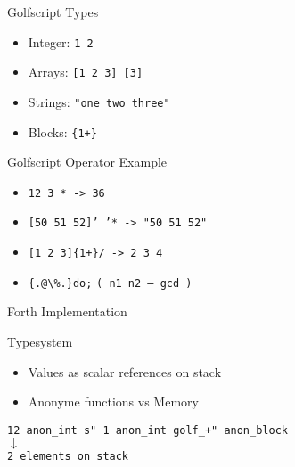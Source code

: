 \documentclass{beamer}
\newcommand{\zwischenueberschrift}[1] { 
    \Huge{#1}
}
\begin{document}
\begin{frame}
    
    \vspace{0.5cm}

    Golfscript Types
    \begin{itemize}
        \item Integer: \texttt{1 2}
        \item Arrays:  \texttt{[1 2 3] [3]}
        \item Strings: \texttt{"one two three"}
        \item Blocks:  \texttt{\{1+\}}
    \end{itemize}

    \vspace{0.5cm}
    \pause 

    Golfscript Operator Example
    \begin{itemize}
        \item \texttt{12 3 * -> 36}
        \item \texttt{[50 51 52]' '* -> "50 51 52"}
        \item \texttt{[1 2 3]\{1+\}/ -> 2 3 4 }
        \item \texttt{\{.@\textbackslash\%.\}do;}  \texttt{( n1 n2 -- gcd )}
    \end{itemize}


\end{frame}


\begin{frame}
\begin{center}
\zwischenueberschrift{Forth Implementation}
\end{center}
\end{frame}


\begin{frame}
    Typesystem
    \begin{itemize}
        \item Values as scalar references on stack
        \item Anonyme functions vs Memory
    \end{itemize}


    \vspace{0.5cm}

    \begin{center}
        \texttt{12 anon\_int s" 1 anon\_int golf\_+" anon\_block} \\
        $\downarrow$ \\
        \texttt{2 elements on stack}
    \end{center}

\end{frame}
\end{document}
